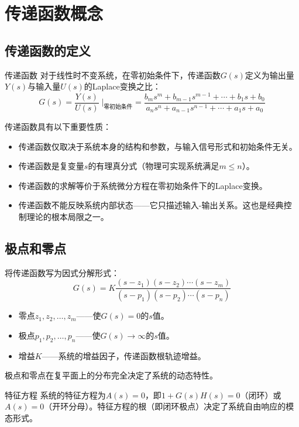 \section{传递函数概念}

\subsection{传递函数的定义}

\begin{mydefinition}{传递函数}
对于线性时不变系统，在零初始条件下，传递函数$G(s)$定义为输出量$Y(s)$与输入量$U(s)$的Laplace变换之比：
\[
G(s) = \frac{Y(s)}{U(s)} \;\Big|_{\text{零初始条件}} = \frac{b_m s^m + b_{m-1}s^{m-1} + \cdots + b_1 s + b_0}{a_n s^n + a_{n-1}s^{n-1} + \cdots + a_1 s + a_0}
\]
\end{mydefinition}

传递函数具有以下重要性质：
\begin{itemize}
\item 传递函数仅取决于系统本身的结构和参数，与输入信号形式和初始条件无关。
\item 传递函数是复变量$s$的有理真分式（物理可实现系统满足$m \leq n$）。
\item 传递函数的求解等价于系统微分方程在零初始条件下的Laplace变换。
\item 传递函数不能反映系统内部状态——它只描述输入-输出关系。这也是经典控制理论的根本局限之一。
\end{itemize}

\subsection{极点和零点}

将传递函数写为因式分解形式：
\[
G(s) = K \frac{(s-z_1)(s-z_2)\cdots(s-z_m)}{(s-p_1)(s-p_2)\cdots(s-p_n)}
\]
\begin{itemize}
\item 零点$z_1,z_2,\dots,z_m$——使$G(s)=0$的$s$值。
\item 极点$p_1,p_2,\dots,p_n$——使$G(s) \to \infty$的$s$值。
\item 增益$K$——系统的增益因子，传递函数根轨迹增益。
\end{itemize}

极点和零点在复平面上的分布完全决定了系统的动态特性。

\begin{mydefinition}{特征方程}
系统的特征方程为$A(s)=0$，即$1+G(s)H(s)=0$（闭环）或$A(s)=0$（开环分母）。特征方程的根（即闭环极点）决定了系统自由响应的模态形式。
\end{mydefinition}


